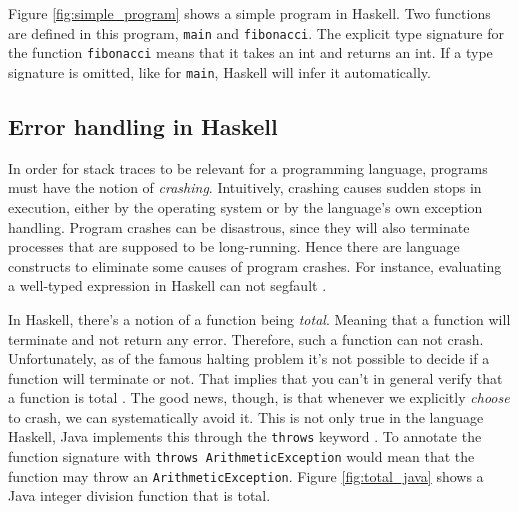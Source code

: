 Figure \ref{fig:simple_program} shows a simple program in Haskell.
Two functions are defined in this program, \texttt{main} and
\texttt{fibonacci}.  The explicit type signature for the function
\texttt{fibonacci} means that it takes an int and returns an int. If a type
signature is omitted, like for \texttt{main}, Haskell will infer it automatically.

\subsection{Error handling in Haskell} \label{sec:error_handling_in_haskell}

In order for stack traces to be relevant for a programming language, programs
must have the notion of \emph{crashing}. Intuitively, crashing causes sudden
stops in execution, either by the operating system or by the language's own
exception handling. Program crashes can be disastrous, since they will also
terminate processes that are supposed to be long-running. Hence there are
language constructs to eliminate some causes of program crashes.
For instance,
evaluating a well-typed expression in Haskell can not segfault \cite{FindingTheNeedle2009}.

In Haskell, there's a notion of a function being \emph{total}. Meaning
that a function will terminate and not return any error. Therefore,
such a function can not crash. Unfortunately, as of the famous halting
problem it's not possible to decide if a function will terminate or not.
That implies that you can't in general
verify that a function is total \cite[p.380]{Hopcroft:2000}.
The good news, though, is that whenever we
explicitly \emph{choose} to crash, we can systematically avoid it. This is not
only true in the language Haskell, Java implements this through the
\texttt{throws} keyword \cite{oracle_java_doc_method_throws}. 
To annotate the function signature with \texttt{throws ArithmeticException}
would mean that the function may throw an \texttt{ArithmeticException}.
Figure \ref{fig:total_java} shows a Java integer division function that
is total.

